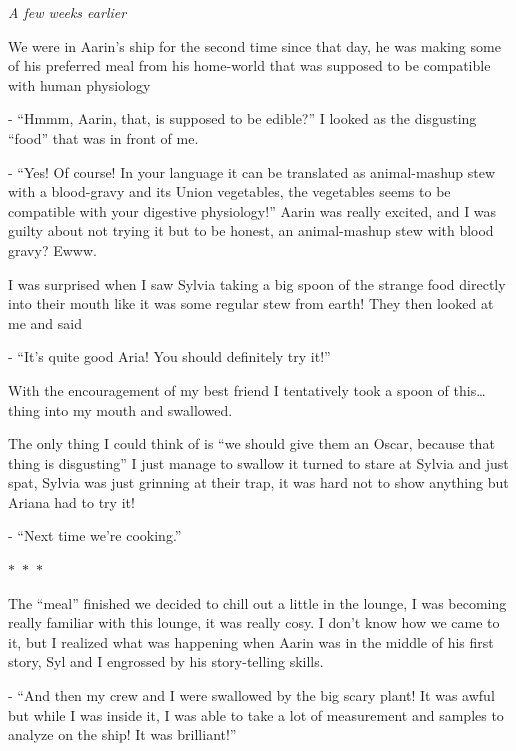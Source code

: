 \documentclass[hidelinks,12pt,a4paper]{book}
\newcommand\sep{\begin{center}
  \boldmath $\ast$~$\ast$~$\ast$
\end{center}}
\begin{document}
\textit{A few weeks earlier}\par
\bigskip

We were in Aarin's ship for the second time since that day, he was making some of his preferred meal from his home-world 
that was supposed to be compatible with human physiology\par
\bigskip

- “Hmmm, Aarin, that, is supposed to be edible?” I looked as the disgusting “food” that was in front of me.\par
\bigskip

- “Yes! Of course! In your language it can be translated as animal-mashup stew with a blood-gravy and its Union vegetables, 
the vegetables seems to be compatible with your digestive physiology!” Aarin was really excited, and I was guilty about 
not trying it but to be honest, an animal-mashup stew with blood gravy? Ewww.\par
\bigskip

I was surprised when I saw Sylvia taking a big spoon of the strange food directly into their mouth like it was some 
regular stew from earth! They then looked at me and said\par
\bigskip

- “It's quite good Aria! You should definitely try it!”\par
\bigskip

With the encouragement of my best friend I tentatively took a spoon of this… thing into my mouth and swallowed.\par
\bigskip

The only thing I could think of is “we should give them an Oscar, because that thing is disgusting” I just manage 
to swallow it turned to stare at Sylvia and just spat, Sylvia was just grinning at their trap, it was hard 
not to show anything but Ariana had to try it!\par
\bigskip

- “Next time we're cooking.”

\sep

The “meal” finished we decided to chill out a little in the lounge, I was becoming really familiar with this lounge, 
it was really cosy. I don't know how we came to it, but I realized what was happening when Aarin was in the middle of his 
first story, Syl and I engrossed by his story-telling skills.\par
\bigskip

- “And then my crew and I were swallowed by the big scary plant! It was awful but while I was inside it, I was able to 
take a lot of measurement and samples to analyze on the ship! It was brilliant!”\par
\bigskip
\end{document}

